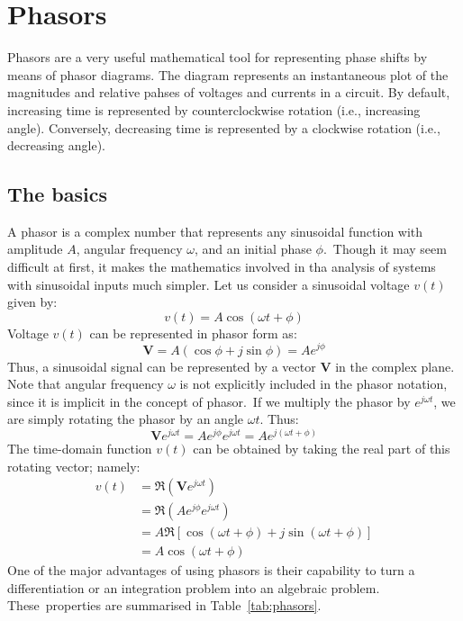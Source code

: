 \chapter{Phasors}

\begin{summary}
 Phasors are a very useful mathematical tool for representing phase shifts by means of phasor diagrams. The diagram represents an instantaneous plot of the magnitudes and relative pahses of voltages and currents in a circuit. By default, increasing time is represented by counterclockwise rotation (i.e., increasing angle). Conversely, decreasing time is represented by a clockwise rotation (i.e., decreasing angle).
\end{summary}

\section{The basics}
A phasor is a complex number that represents any sinusoidal function with amplitude $A$, angular frequency $\omega$, and an initial phase $\phi$. Though it may seem difficult at first, it makes the mathematics involved in tha analysis of systems with sinusoidal inputs much simpler. Let us consider a sinusoidal voltage $v(t)$ given by:
\begin{equation}
v(t) = A \cos(\omega t +\phi)
\end{equation}
Voltage $v(t)$ can be represented in phasor form as: 
\begin{equation}
\bm{V} = A(\cos\phi + j\sin\phi) = Ae^{j\phi}
\end{equation}
Thus, a sinusoidal signal can be represented by a vector $\bm{V}$ in the complex plane. Note that angular frequency $\omega$ is not explicitly included in the phasor notation, since it is implicit in the concept of phasor. If we multiply the phasor by $e^{j\omega t}$, we are simply rotating the phasor by an angle $\omega t$. Thus:
\[\bm{V}e^{j\omega t} = Ae^{j\phi}e^{j\omega t} = Ae^{j(\omega t + \phi)} \]
The time-domain function $v(t)$ can be obtained by taking the real part of this rotating vector; namely:
\begin{equation}
\begin{split}
v(t) &= \Re\left(\bm{V}e^{j\omega t}\right)\\
     &= \Re\left(Ae^{j\phi}e^{j\omega t}\right)\\
     &= A\Re\left[\cos(\omega t + \phi) +j \sin(\omega t + \phi)\right]\\
     &= A\cos(\omega t + \phi)
\end{split}
\end{equation} 
One of the major advantages of using phasors is their capability to turn a differentiation or an integration problem into an algebraic problem. These properties are summarised in Table~\ref{tab:phasors}.

